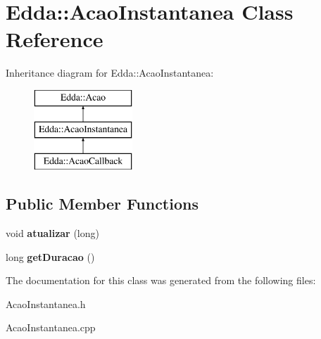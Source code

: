 \hypertarget{class_edda_1_1_acao_instantanea}{
\section{Edda::AcaoInstantanea Class Reference}
\label{class_edda_1_1_acao_instantanea}
}
Inheritance diagram for Edda::AcaoInstantanea:\begin{figure}[H]
\begin{center}
\leavevmode
\includegraphics[height=3.000000cm]{class_edda_1_1_acao_instantanea}
\end{center}
\end{figure}
\subsection*{Public Member Functions}
\begin{DoxyCompactItemize}
\item 
\hypertarget{class_edda_1_1_acao_instantanea_ab00831705f1b6c385b07e15398ac8243}{
void {\bfseries atualizar} (long)}
\label{class_edda_1_1_acao_instantanea_ab00831705f1b6c385b07e15398ac8243}

\item 
\hypertarget{class_edda_1_1_acao_instantanea_a8847ea6960937282148d44d39ccc9e4f}{
long {\bfseries getDuracao} ()}
\label{class_edda_1_1_acao_instantanea_a8847ea6960937282148d44d39ccc9e4f}

\end{DoxyCompactItemize}


The documentation for this class was generated from the following files:\begin{DoxyCompactItemize}
\item 
AcaoInstantanea.h\item 
AcaoInstantanea.cpp\end{DoxyCompactItemize}
